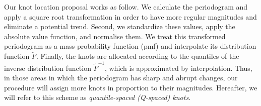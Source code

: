 \documentclass[twocolumn,final]{svjour3}
\newcommand{\bm}[1]{\mbox{\boldmath $#1$}}
\newcommand{\pmr}{ \color{red}}
\begin{document}
Our knot location proposal works as follow.  We calculate the periodogram and apply a square root transformation in order to have more regular magnitudes and eliminate a potential trend.  Second, we standardize these values, apply the absolute value function,{\pmr and normalise them}.  We treat this transformed periodogram as a {\pmr mass probability} function (pmf) and interpolate its distribution function $\widetilde{F}$.  Finally, the knots are allocated according to the quantiles of the inverse distribution function $\widetilde{F}^{-1}$, {\pmr which is approximated by interpolation.}  Thus, in those areas in which the periodogram has sharp and abrupt changes, our procedure will assign more knots in proportion to their magnitudes. Hereafter, we will refer to this scheme as {\em  quantile-spaced (Q-spaced) knots}.%

\end{document}
